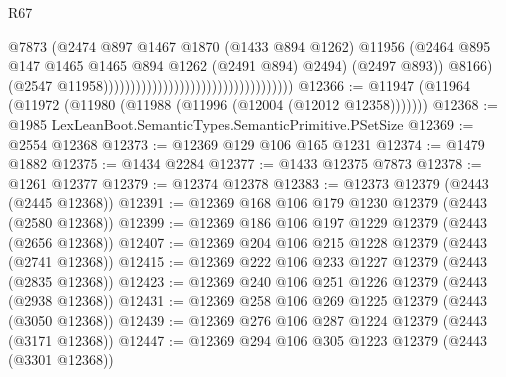 \begin{lexlean}{R67}
\begin{coremodule}
                                                                          @7873
                                                                          (@2474
                                                                            @897
                                                                            @1467
                                                                            @1870
                                                                            (@1433 @894 @1262)
                                                                            @11956
                                                                            (@2464
                                                                              @895
                                                                              @147
                                                                              @1465
                                                                              @1465
                                                                              @894
                                                                              @1262
                                                                              (@2491 @894)
                                                                              @2494)
                                                                            (@2497 @893))
                                                                          @8166)
                                                                        (@2547
                                                                          @11958)))))))))))))))))))))))))))))))))))
@12366 := @11947 (@11964 (@11972 (@11980 (@11988 (@11996 (@12004 (@12012 @12358)))))))
@12368 := @1985 LexLeanBoot.SemanticTypes.SemanticPrimitive.PSetSize
@12369 := @2554 @12368
@12373 := @12369 @129 @106 @165 @1231
@12374 := @1479 @1882
@12375 := @1434 @2284
@12377 := @1433 @12375 @7873
@12378 := @1261 @12377
@12379 := @12374 @12378
@12383 := @12373 @12379 (@2443 (@2445 @12368))
@12391 := @12369 @168 @106 @179 @1230 @12379 (@2443 (@2580 @12368))
@12399 := @12369 @186 @106 @197 @1229 @12379 (@2443 (@2656 @12368))
@12407 := @12369 @204 @106 @215 @1228 @12379 (@2443 (@2741 @12368))
@12415 := @12369 @222 @106 @233 @1227 @12379 (@2443 (@2835 @12368))
@12423 := @12369 @240 @106 @251 @1226 @12379 (@2443 (@2938 @12368))
@12431 := @12369 @258 @106 @269 @1225 @12379 (@2443 (@3050 @12368))
@12439 := @12369 @276 @106 @287 @1224 @12379 (@2443 (@3171 @12368))
@12447 := @12369 @294 @106 @305 @1223 @12379 (@2443 (@3301 @12368))

\end{coremodule}
\end{lexlean}
